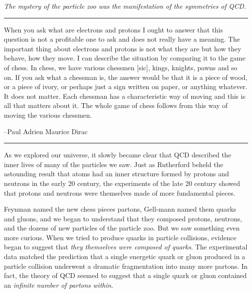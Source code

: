 \textit{The mystery of the particle zoo was the manifestation of the symmetries of QCD.}


\vspace{1.5cm}
\hrule
\begingroup

\setlength \epigraphwidth {\textwidth}
\setlength \epigraphrule {0pt}
\renewcommand {\epigraphflush} {center}
\renewcommand {\sourceflush} {center}

\epigraph{
        When you ask what are electrons and protons I ought to answer that this question is not a profitable one to ask and does not really have a meaning.
    The important thing about electrons and protons is not what they are but how they behave, how they move.
    I can describe the situation by comparing it to the game of chess.
    In chess, we have various chessmen [sic], kings, knights, pawns and so on.
    If you ask what a chessman is, the answer would be that it is a piece of wood, or a piece of ivory, or perhaps just a sign written on paper, or anything whatever.
    It does not matter.
    Each chessman has a characteristic way of moving and this is all that matters about it.
    The whole game of chess follows from this way of moving the various chessmen.
}{--Paul Adrien Maurice Dirac}

\endgroup

\vspace{0.2cm}
\hrule
\vspace{1.5cm}


As we explored our universe, it slowly became clear that QCD described the inner lives of many of the particles we saw.
%
Just as Rutherford beheld the astounding result that atoms had an inner structure formed by protons and neutrons in the early 20\th{} century, the experiments of the late 20\th{} century showed that protons and neutrons were themselves made of more fundamental pieces.

Feynman named the new chess pieces partons, Gell-mann named them quarks and gluons, and we began to understand that they composed protons, neutrons, and the dozens of new particles of the particle zoo.
%
But we saw something even more curious.
%
When we tried to produce quarks in particle collisions, evidence began to suggest that \textit{they themselves were composed of quarks}.
%
The experimental data matched the prediction that a single energetic quark or gluon produced in a particle collision underwent a dramatic fragmentation into many more partons.
%
In fact, the theory of QCD seemed to suggest that a single quark or gluon contained an \textit{infinite number of partons within}.

